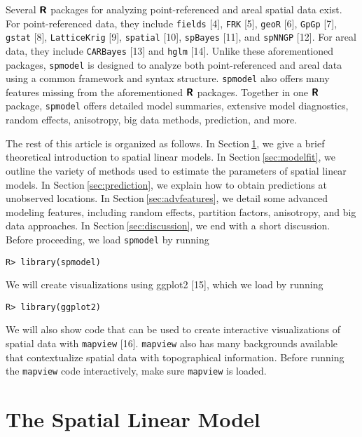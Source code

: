 \documentclass[10pt,letterpaper]{article}
\begin{document}
Several \(\textbf{\textsf{R}}\) packages for analyzing point-referenced
and areal spatial data exist. For point-referenced data, they include
\texttt{fields} {[}4{]}, \texttt{FRK} {[}5{]}, \texttt{geoR} {[}6{]},
\texttt{GpGp} {[}7{]}, \texttt{gstat} {[}8{]}, \texttt{LatticeKrig}
{[}9{]}, \texttt{spatial} {[}10{]}, \texttt{spBayes} {[}11{]}, and
\texttt{spNNGP} {[}12{]}. For areal data, they include \texttt{CARBayes}
{[}13{]} and \texttt{hglm} {[}14{]}. Unlike these aforementioned
packages, \texttt{spmodel} is designed to analyze both point-referenced
and areal data using a common framework and syntax structure.
\texttt{spmodel} also offers many features missing from the
aforementioned \(\textbf{\textsf{R}}\) packages. Together in one
\(\textbf{\textsf{R}}\) package, \texttt{spmodel} offers detailed model
summaries, extensive model diagnostics, random effects, anisotropy, big
data methods, prediction, and more.

The rest of this article is organized as follows. In
Section\(~\)\ref{sec:theomodel}, we give a brief theoretical
introduction to spatial linear models. In
Section\(~\)\ref{sec:modelfit}, we outline the variety of methods used
to estimate the parameters of spatial linear models. In
Section\(~\)\ref{sec:prediction}, we explain how to obtain predictions
at unobserved locations. In Section\(~\)\ref{sec:advfeatures}, we detail
some advanced modeling features, including random effects, partition
factors, anisotropy, and big data approaches. In
Section\(~\)\ref{sec:discussion}, we end with a short discussion. Before
proceeding, we load \texttt{spmodel} by running

\begin{verbatim}
R> library(spmodel)
\end{verbatim}

We will create visualizations using ggplot2 {[}15{]}, which we load by
running

\begin{verbatim}
R> library(ggplot2)
\end{verbatim}

We will also show code that can be used to create interactive
visualizations of spatial data with \texttt{mapview} {[}16{]}.
\texttt{mapview} also has many backgrounds available that contextualize
spatial data with topographical information. Before running the
\texttt{mapview} code interactively, make sure \texttt{mapview} is
loaded.

\hypertarget{sec:theomodel}{%
\section{The Spatial Linear Model}\label{sec:theomodel}}
\end{document}
